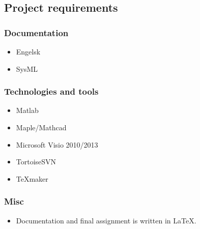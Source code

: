 \subsection{Project requirements}

\subsubsection{Documentation}
\begin{itemize}
\item Engelsk
\item SysML
\end{itemize}

\subsubsection{Technologies and tools}
\begin{itemize}
\item Matlab
\item Maple/Mathcad
\item Microsoft Visio 2010/2013
\item TortoiseSVN
\item TeXmaker
\end{itemize}

\subsubsection{Misc}
\begin{itemize}
\item Documentation and final assignment is written in LaTeX.
\end{itemize}

